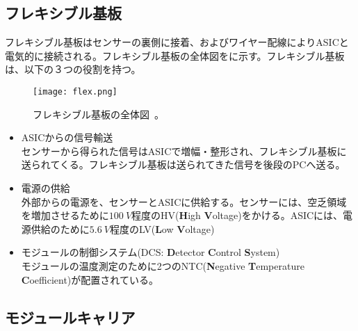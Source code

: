

\subsection{フレキシブル基板}
\label{sec:flex}

フレキシブル基板はセンサーの裏側に接着、およびワイヤー配線によりASICと電気的に接続される。フレキシブル基板の全体図をに示す。フレキシブル基板は、以下の３つの役割を持つ。

\begin{figure}[tbp]
  \centering
  \texttt{[image: flex.png]}
  \caption[フレキシブル基板]{フレキシブル基板の全体図\ \cite{itk}。}
  \label{fig:flex}
\end{figure}

\begin{itemize}
  \item ASICからの信号輸送  \\
  センサーから得られた信号はASICで増幅・整形され、フレキシブル基板に送られてくる。フレキシブル基板は送られてきた信号を後段のPCへ送る。
  \item 電源の供給 \\
  外部からの電源を、センサーとASICに供給する。センサーには、空乏領域を増加させるために$100\ \si{V}$程度のHV(\textbf{H}igh \textbf{V}oltage)をかける。ASICには、電源供給のために$5.6\ \si{V}$程度のLV(\textbf{L}ow \textbf{V}oltage)
  \item モジュールの制御システム(DCS: \textbf{D}etector \textbf{C}ontrol \textbf{S}ystem) \\
  モジュールの温度測定のために2つのNTC(\textbf{N}egative \textbf{T}emperature \textbf{C}oefficient)が配置されている。
\end{itemize}

\subsection{モジュールキャリア}
\label{sec:carrier}

